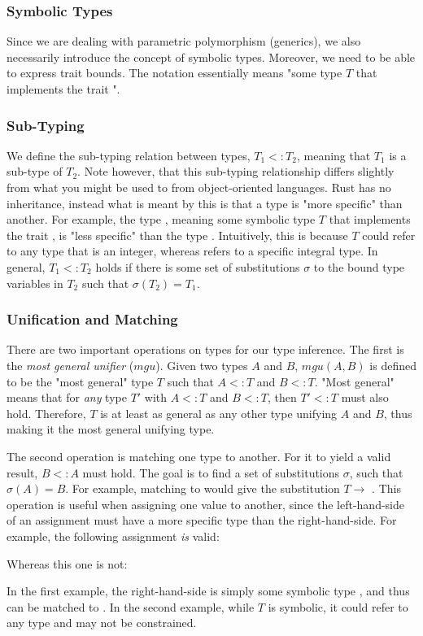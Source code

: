 \subsubsection{Symbolic Types}
Since we are dealing with parametric polymorphism (generics), we also necessarily introduce the concept of symbolic types. Moreover, we need to be able to express trait bounds. The notation  essentially means "some type $T$ that implements the trait ".

\subsubsection{Sub-Typing}
We define the sub-typing relation between types, $T_1 <: T_2$, meaning that $T_1$ is a sub-type of $T_2$. Note however, that this sub-typing relationship differs slightly from what you might be used to from object-oriented languages. Rust has no inheritance, instead what is meant by this is that a type is "more specific" than another. For example, the type , meaning some symbolic type $T$ that implements the trait , is "less specific" than the type . Intuitively, this is because $T$ could refer to any type that is an integer, whereas  refers to a specific integral type. In general, $T_1 <: T_2$ holds if there is some set of substitutions $\sigma$ to the bound type variables in $T_2$ such that $\sigma(T_2) = T_1$.

\subsubsection{Unification and Matching}
There are two important operations on types for our type inference. The first is the \textit{most general unifier} ($mgu$). Given two types $A$ and $B$, $mgu(A, B)$ is defined to be the "most general" type $T$ such that $A <: T$ and $B <: T$. "Most general" means that for \textit{any} type $T'$ with $A <: T$ and $B <: T$, then $T' <: T$ must also hold. Therefore, $T$ is at least as general as any other type unifying $A$ and $B$, thus making it the most general unifying type.
\par
The second operation is matching one type to another. For it to yield a valid result, $B <: A$ must hold. The goal is to find a set of substitutions $\sigma$, such that $\sigma(A) = B$. For example, matching  to  would give the substitution $T \to $ . This operation is useful when assigning one value to another, since the left-hand-side of an assignment must have a more specific type than the right-hand-side. For example, the following assignment \textit{is} valid: \par
{} \par
Whereas this one is not: \par
{} \par
In the first example, the right-hand-side is simply some symbolic type , and thus can be matched to . In the second example, while $T$ is symbolic, it could refer to any type and may not be constrained.

